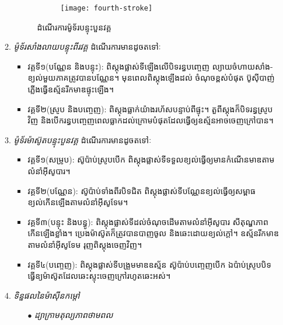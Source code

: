 \begin{itemize}
\begin{enumerate}
\begin{figure}[H]
			\begin{subfigure}{.2\textwidth}
				\texttt{[image: fourth-stroke]}
			\end{subfigure}
			\caption{ដំណើរការម៉ូទ័របន្ទុះបួនវគ្គ}
		\end{figure}
		\item \emph{\kml ម៉ូទ័រសាំងលាយបន្ទុះពីរវគ្គ} ដំណើរការមានដូចតទៅៈ
		\begin{itemize}
			\item វគ្គទី១(បណ្ណែន និងបន្ទុះ): ពិស្តុងផ្លាស់ទីឡើងលើបិទរន្ធបញ្ចេញ ល្យាយចំហាយសាំង-ខ្យល់មួយភាគត្រូវបានបណ្ណែន។ មុនពេលពិស្តុងឡើងដល់ ចំណុចខ្ពស់បំផុត ប៊ូសុីបាញ់ភ្លើងធ្វើឧស្ម័នរីកមាឌផ្ទុះឡើង។
			\item វគ្គទី២(ស្រូប និងបញ្ចេញ): ពិស្តុងធ្លាក់យ៉ាងរហ័សបន្ទាប់ពីផ្ទុះ។ តួពីស្តុងក៏បិទរន្ធស្រូបវិញ និងបើករន្ធបញ្ចេញពេលធ្លាកដល់ក្រោមបំផុតដែលធ្វើឲ្យឧស្ម័នអាចចេញក្រៅបាន។
		\end{itemize}
		\item \emph{\kml ម៉ូទ័រម៉ាស៊ូតបន្ទុះបួនវគ្គ} ដំណើរការមានដូចតទៅៈ 
		\begin{itemize}
			\item វគ្គទី១(សម្រូប): ស៊ូប៉ាប់ស្រូបបើក ពិស្តុងផ្លាស់ទីទទួលខ្យល់ធ្វើឲ្យមានកំណើនមាឌតាមលំនាំអុីសូបារ។
			\item វគ្គទី២(បណ្ណែន): ស៊ូប៉ាប់ទាំងពីរបិទជិត ពិស្តុងផ្លាស់ទីបណ្ណែនខ្យល់ធ្វើឲ្យសម្ពាធខ្យល់កើនឡើងតាមលំនាំអុីសូទែម។
			\item វគ្គទី៣(បន្ទុះ និងបន្ធូ): ពិស្តុងផ្លាស់ទីដល់ចំណុចដើមតាមលំនាំអុីសូបារ សីតុណ្ហភាពកើនឡើងខ្លាំង។ ប្រេងម៉ាស៊ូតក៏ត្រូវបានបាញចូល និងឆេះដោយខ្យល់ក្តៅ។ ឧស្ម័នរីកមាឌតាមលំនាំអុីសូទែម រុញពិស្តុងចេញវិញ។
			\item វគ្គទី៤(បញ្ចេញ): ពិស្តុងផ្លាស់ទីបង្រួមមាឌឧស្ម័ន ស៊ូប៉ាប់បញ្ចេញបើក ឯប៉ាប់ស្រូបបិទធ្វើឧ្យម៉ាស៊ូតដែលឆេះស្ទុះចេញក្រៅរហូតឆេះអស់។
		\end{itemize}
		\item \emph{\kml ទិន្នផលនៃម៉ាសុីនកម្តៅ}
			\begin{itemize}
				\item [$\bullet$] \emph{\kml ដ្យាក្រាមតុល្យភាពថាមពល}
				\begin{figure}[H]
					\centering
\end{figure}
\end{itemize}
\end{enumerate}
\end{itemize}
